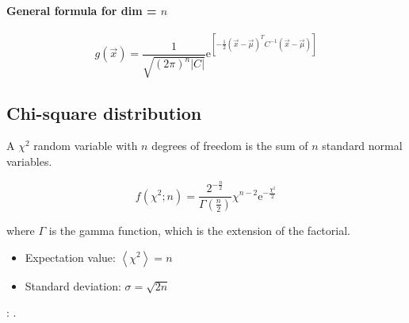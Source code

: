 
\paragraph{General formula for dim = $n$}

\begin{equation}\label{eq:bivariate_normal_joint_density}
	g(\vec{x}) = \frac{1}{\sqrt{(2 \pi)^{n} {\left| C \right|}}} 
	\mathrm{e}^{\left[ - \frac{1}{2} (\vec{x} - \vec{\mu})^{T} C^{-1} (\vec{x} - \vec{\mu}) \right]}
\end{equation}

\subsection{Chi-square distribution}
\label{subsec:chisquare_distr}

A $\chi^{2}$ random variable with $n$ degrees of freedom is the sum of $n$ standard normal variables.

\begin{equation}\label{eq:chisquare_distr}
	f(\chi^{2} ; n) = \frac{2^{- \frac{n}{2}}}{\Gamma(\frac{n}{2})} \chi^{n - 2} \mathrm{e}^{- \frac{\chi^{2}}{2}}
\end{equation}

where $\Gamma$ is the gamma function, which is the extension of the factorial.


\begin{itemize}
	\item Expectation value: $\left \langle \chi^{2} \right \rangle = n$
	\item Standard deviation: $\sigma = \sqrt{2n}$
\end{itemize}

: .
